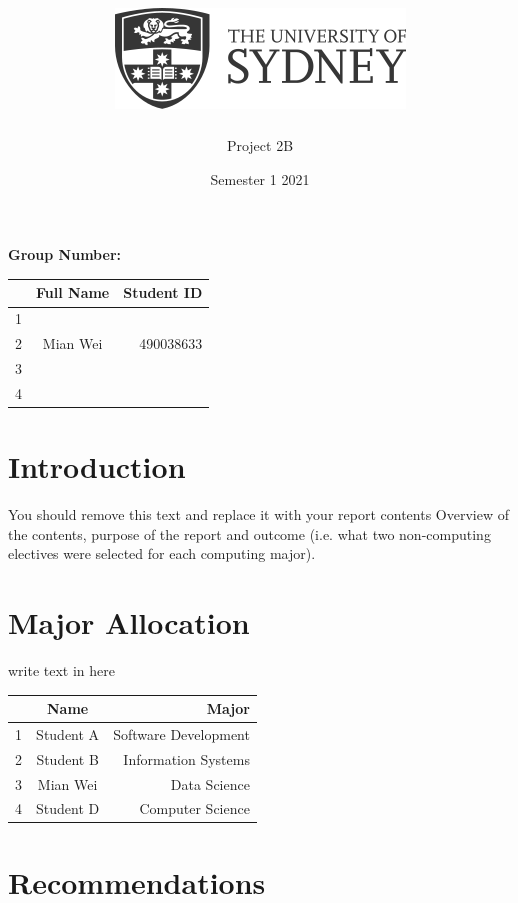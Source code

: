\documentclass{article}
\title{\includegraphics[scale=.5]{usydlogo.png}
\linebreak \\
\noindent \scalebox{1}{\helveticafamily INFO1111: Computing 1A Professionalism}
}
\date{Semester 1 2021}
\author{Project 2B}
\begin{document}
\maketitle

\begin{center}
    \textbf{Group Number:}
\end{center}

\begin{center}
\begin{tabular}{|l|c|r|}
\hline
  & Full Name & Student ID \\ \hline
1 &           &            \\ \hline
2 & Mian Wei  & 490038633  \\ \hline
3 &           &            \\ \hline
4 &           &            \\ \hline
\end{tabular}
\end{center}
\thispagestyle{empty}
\newpage

\setcounter{page}{1}
\section{Introduction}
You should remove this text and replace it with your report contents
Overview of the contents, purpose of the report and outcome (i.e. what two non-computing electives were selected for each computing major).


\section{Major Allocation}
write text in here
\begin{center}
\begin{tabular}{|l|c|r|}
\hline
  & Name      & Major                \\ \hline
1 & Student A & Software Development \\ \hline
2 & Student B & Information Systems  \\ \hline
3 & Mian Wei  & Data Science         \\ \hline
4 & Student D & Computer Science     \\ \hline
\end{tabular}
\end{center}

\section{Recommendations}
\end{document}
